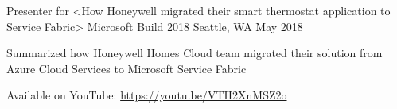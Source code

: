 

\begin{cventries}

  \cventry
    {Presenter for <How Honeywell migrated their smart thermostat application to Service Fabric>} %
    {Microsoft Build 2018} %
    {Seattle, WA} %
    {May 2018} %
    {
      \begin{cvitems} %
        \item {Summarized how Honeywell Homes Cloud team migrated their solution from Azure Cloud Services to Microsoft Service Fabric}
        \item {Available on YouTube: \href{https://youtu.be/VTH2XnMSZ2o}{https://youtu.be/VTH2XnMSZ2o}}
      \end{cvitems}
    }


\end{cventries}
